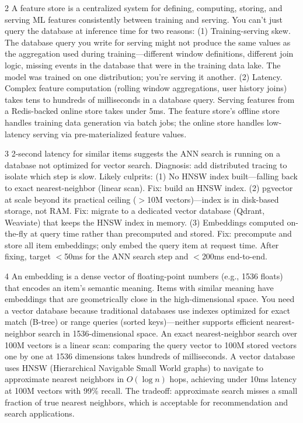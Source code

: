 \documentclass[11pt,a4paper]{article}
\begin{document}
\begin{answerbox}{2}
A feature store is a centralized system for defining, computing, storing, and serving ML features consistently between training and serving. You can't just query the database at inference time for two reasons: (1) Training-serving skew. The database query you write for serving might not produce the same values as the aggregation used during training---different window definitions, different join logic, missing events in the database that were in the training data lake. The model was trained on one distribution; you're serving it another. (2) Latency. Complex feature computation (rolling window aggregations, user history joins) takes tens to hundreds of milliseconds in a database query. Serving features from a Redis-backed online store takes under 5ms. The feature store's offline store handles training data generation via batch jobs; the online store handles low-latency serving via pre-materialized feature values.
\end{answerbox}

\begin{answerbox}{3}
2-second latency for similar items suggests the ANN search is running on a database not optimized for vector search. Diagnosis: add distributed tracing to isolate which step is slow. Likely culprits: (1) No HNSW index built---falling back to exact nearest-neighbor (linear scan). Fix: build an HNSW index. (2) pgvector at scale beyond its practical ceiling ($>$10M vectors)---index is in disk-based storage, not RAM. Fix: migrate to a dedicated vector database (Qdrant, Weaviate) that keeps the HNSW index in memory. (3) Embeddings computed on-the-fly at query time rather than precomputed and stored. Fix: precompute and store all item embeddings; only embed the query item at request time. After fixing, target $<$50ms for the ANN search step and $<$200ms end-to-end.
\end{answerbox}

\begin{answerbox}{4}
An embedding is a dense vector of floating-point numbers (e.g., 1536 floats) that encodes an item's semantic meaning. Items with similar meaning have embeddings that are geometrically close in the high-dimensional space. You need a vector database because traditional databases use indexes optimized for exact match (B-tree) or range queries (sorted keys)---neither supports efficient nearest-neighbor search in 1536-dimensional space. An exact nearest-neighbor search over 100M vectors is a linear scan: comparing the query vector to 100M stored vectors one by one at 1536 dimensions takes hundreds of milliseconds. A vector database uses HNSW (Hierarchical Navigable Small World graphs) to navigate to approximate nearest neighbors in $O(\log n)$ hops, achieving under 10ms latency at 100M vectors with 99\% recall. The tradeoff: approximate search misses a small fraction of true nearest neighbors, which is acceptable for recommendation and search applications.
\end{answerbox}
\end{document}
